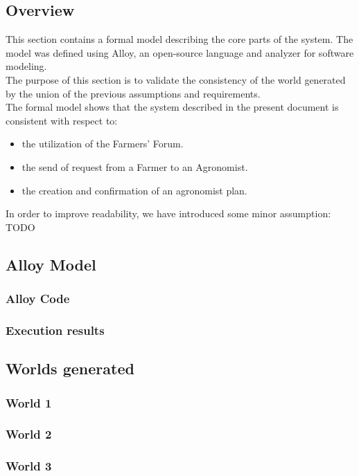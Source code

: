 \subsection{Overview}
\begin{flushleft}
This section contains a formal model describing the core parts of the system. The model was defined using Alloy, an open-source language and analyzer for software modeling.\\
The purpose of this section is to validate the consistency of the world generated by the union of the previous assumptions and requirements.\smallskip\\

The formal model shows that the system described in the present document is consistent with respect to:
\begin{itemize}
	\item the utilization of the Farmers' Forum.
	\item the send of request from a Farmer to an Agronomist.
	\item the creation and confirmation of an agronomist plan.
\end{itemize}

In order to improve readability, we have introduced some minor assumption:
TODO
\smallskip\\
\end{flushleft}

\subsection{Alloy Model}

\subsubsection{Alloy Code}


\subsubsection{Execution results}

\subsection{Worlds generated}
\subsubsection{World 1}
\subsubsection{World 2}
\subsubsection{World 3}
